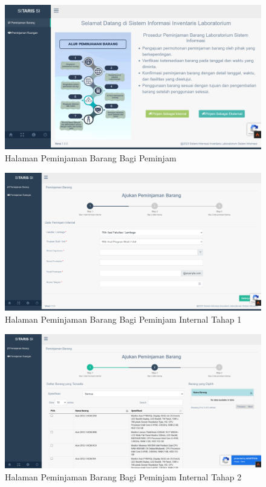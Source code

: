 \begin{enumerate}
        \begin{figure}
          \centering
          \includegraphics[width=0.82\linewidth]{konten//gambar/peminjaman barang pinjam hasil.png}
          \caption{Halaman Peminjaman Barang Bagi Peminjam}
          \label{fig:enter-label}
        \end{figure}

        \begin{figure}
          \centering
          \includegraphics[width=0.82\linewidth]{konten//gambar/peminjaman barang tambah internal 1 hasil.png}
          \caption{Halaman Peminjaman Barang Bagi Peminjam Internal Tahap 1}
          \label{fig:enter-label}
        \end{figure}

        \begin{figure}
          \centering
          \includegraphics[width=0.82\linewidth]{konten//gambar/peminjaman barang tambah internal 2 hasil.png}
          \caption{Halaman Peminjaman Barang Bagi Peminjam Internal Tahap 2}
          \label{fig:enter-label}
        \end{figure}


\end{enumerate}
